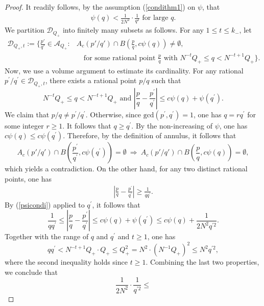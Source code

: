 \documentclass[10pt,a4paper]{amsart}
\begin{document}
\begin{proof}\label{trequire}
    It readily follows, by the assumption {(\ref{condithm1})} on $\psi$, that
    \begin{align}\label{psicondi}
    \psi(q)<\frac{1}{2N^2}\cdot\frac{1}{q^2}\text{ for large }q.
    \end{align}
     We partition $\mathcal{D}_{Q_+}$ into finitely many subsets as follows. For any $1\le t\le k_-$, let
     \begin{align*}
\mathcal{D}_{Q_+,t}:= \Bigg\{ \frac{p'}{q'} \in \mathcal{A}_{Q_+} : & A_{c}(p'/q') \cap B\left(\frac{p}{q}, c\psi(q)\right) \neq \emptyset, \\
& \quad \text{for some rational point } \frac{p}{q} \text{ with } N^{-t}Q_+\le q< N^{-t+1}Q_+ \Bigg\}.
\end{align*}
Now, we use a volume argument to estimate its cardinality. For any rational $p^{\prime}/q^{\prime}\in\mathcal{D}_{Q_+,t}$, there exists a rational point $p/q$ such that $$ N^{-t}Q_+\le q<N^{-t+1}Q_+ \textrm{ and } \left|\frac{p}{q}-\frac{p^{\prime}}{q^{\prime}}\right|\le c\psi(q)+\psi(q^{\prime}).$$
We claim that ${p}/{q}\neq{p^{\prime}}/{q^{\prime}}.$ Otherwise, since $\textrm{gcd}(p^{\prime},q^{\prime})=1$, one has $q=rq^{\prime}$ for some integer $r\ge 1$. It follows that $q\ge q^{\prime}$. By the non-increasing of $\psi$, one has $c\psi(q)\le c\psi(q^{\prime})$. Therefore, by the definition of annulus, it follows that
$$A_{c}(p'/q') \cap B\left(\frac{p^{\prime}}{q^{\prime}}, c\psi(q^{\prime})\right) =\emptyset\ \Longrightarrow\  A_{c}(p'/q') \cap B\left(\frac{p}{q}, c\psi(q)\right) =\emptyset,$$
which yields a contradiction. On the other hand, for any two distinct rational points, one has
\begin{align*}
\left|\frac{p}{q}-\frac{p^{\prime}}{q^{\prime}}\right|\ge\frac{1}{qq^{\prime}}.
\end{align*}
By (\ref{psicondi}) applied to $q^{\prime}$, it follows that
$$\frac{1}{qq^{\prime}}\le  \left|\frac{p}{q}-\frac{p^{\prime}}{q^{\prime}}\right|\le  c\psi(q)+\psi(q^{\prime})\le c\psi(q)+\frac{1}{2N^2q^{\prime2}}.$$
Together with the range of $q$ and $q^{\prime}$ and $t\ge 1$, one has $$qq^{\prime}< N^{-t+1}Q_+\cdot Q_+\le Q_{+}^2
= N^2\cdot (N^{-1}Q_+)^2\le N^2q^{\prime2}, $$
where the second inequality holds since $t\ge 1$.
    Combining the last two properties, we conclude that
    $$\frac{1}{2N^2}\cdot\frac{1}{q^{\prime2}}\le
$$
\end{proof}
\end{document}
